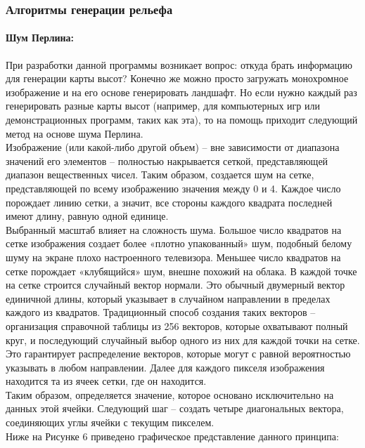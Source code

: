 \documentclass[a4paper, 10pt]{article}
\begin{document}
	\subsubsection{Алгоритмы генерации рельефа}
	\paragraph{Шум Перлина:}
	При разработки данной программы возникает вопрос: откуда брать информацию для генерации карты высот? Конечно же можно просто загружать монохромное изображение и на его основе генерировать ландшафт. Но если нужно каждый раз генерировать разные карты высот (например, для компьютерных игр или демонстрационных программ, таких как эта), то на помощь приходит следующий метод на основе шума Перлина.\cite{perlin}
	\\ \hspace*{5mm} Изображение (или какой-либо другой объем) – вне зависимости от диапазона значений его элементов – полностью накрывается сеткой, представляющей диапазон вещественных чисел. Таким образом, создается шум на сетке, представляющей по всему изображению значения между 0 и 4. Каждое число порождает линию сетки, а значит, все стороны каждого квадрата последней имеют длину, равную одной единице.
	\\ \hspace*{5mm} Выбранный масштаб влияет на сложность шума. Большое число квадратов на сетке изображения создает более «плотно упакованный» шум, подобный белому шуму на экране плохо настроенного телевизора. Меньшее число квадратов на сетке порождает «клубящийся» шум, внешне похожий на облака.
	В каждой точке на сетке строится случайный вектор нормали. Это обычный двумерный вектор единичной длины, который указывает в случайном направлении в пределах каждого из квадратов. Традиционный способ создания таких векторов – организация справочной таблицы из 256 векторов, которые охватывают полный круг, и последующий случайный выбор одного из них для каждой точки на сетке. Это гарантирует распределение векторов, которые могут с равной вероятностью указывать в любом направлении. Далее для каждого пикселя изображения находится та из ячеек сетки, где он находится.
	\\ \hspace*{5mm} Таким образом, определяется значение, которое основано исключительно на данных этой ячейки. Следующий шаг – создать четыре диагональных вектора, соединяющих углы ячейки с текущим пикселем.
	\\Ниже на Рисунке 6 приведено графическое представление данного принципа:
\end{document}
